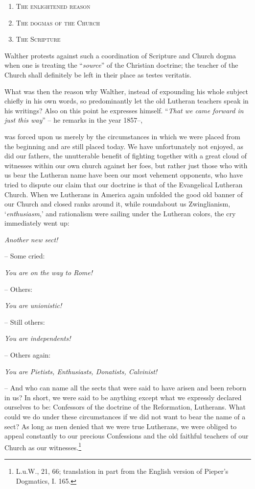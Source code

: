                 \begin{enumerate}
                \item \textsc{The enlightened reason}
                \item \textsc{The dogmas of the Church}
                \item \textsc{The Scripture}
                \end{enumerate} 
                 Walther protests against such a coordination of Scripture and Church dogma when one is treating the “\textit{source}” of the Christian doctrine; the teacher of the Church shall definitely be left in their place as testes veritatis.

                What was then the reason why Walther, instead of expounding his whole subject chiefly in his own words, so predominantly let the old Lutheran teachers speak in his writings?  Also on this point he expresses himself.  “\textit{That we came forward in just this way}” – he remarks in the year \textsc{1857}--, \begin{fancyquotes} was forced upon us merely by the circumstances in which we were placed from the beginning and are still placed today.  We have unfortunately not enjoyed, as did our fathers, the unutterable benefit of fighting together with a great cloud of witnesses within our own church against her foes, but rather just those who with us bear the Lutheran name have been our most vehement opponents, who have tried to dispute our claim that our doctrine is that of the Evangelical Lutheran Church.  When we Lutherans in America again unfolded the good old banner of our Church and closed ranks around it, while roundabout us Zwinglianism, ‘\textit{enthusiasm},’ and rationalism were sailing under the Lutheran colors, the cry immediately went up:\begin{displayquote} \textit{Another new sect!} \end{displayquote}-- Some cried: \begin{displayquote}\textit{You are on the way to Rome!}\end{displayquote}-- Others:\begin{displayquote} \textit{You are unionistic!}\end{displayquote}-- Still others:\begin{displayquote} \textit{You are independents!} \end{displayquote}-- Others again: \begin{displayquote}\textit{You are Pietists, Enthusiasts, Donatists, Calvinist!}\end{displayquote}  -- And who can name all the sects that were said to have arisen and been reborn in us?  In short, we were said to be anything except what we expressly declared ourselves to be:  Confessors of the doctrine of the Reformation, Lutherans.  What could we do under these circumstances if we did not want to bear the name of a sect?  As long as men denied that we were true Lutherans, we were obliged to appeal constantly to our precious Confessions and the old faithful teachers of our Church as our witnesses.\footnote{L.u.W., 21, 66; translation in part from the English version of Pieper’s Dogmatics, I. 165.}\end{fancyquotes}
